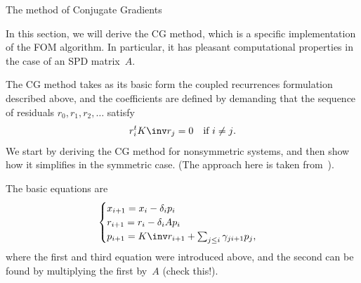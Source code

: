  {The method of Conjugate Gradients}
\label{sec:cg}

In this section, we will derive the \acf{CG} method, which is a
specific implementation of the \ac{FOM} algorithm. In particular, it
has pleasant computational properties in the case of an \ac{SPD}
matrix~$A$.

The \ac{CG} method takes as its basic form the coupled recurrences
formulation described above, and the
coefficients are defined by demanding that
the sequence of residuals $r_0,r_1,r_2,\ldots$ satisfy
\[ r_i^tK\inv r_j=0\quad\hbox{if $i\not=j$}. \]
We start by deriving the \ac{CG} method for nonsymmetric systems, and
then show how it simplifies in the symmetric case. (The approach here
is taken from~\cite{Eijkhout2010ICCS-krylov}).

The basic equations are
\begin{equation}
  \begin{cases}
    x_{i+1}=x_i-\delta_i p_i \\
    r_{i+1}=r_i-\delta_iA p_i \\
    p_{i+1} = K\inv r_{i+1}+\sum_{j\leq i}\gamma_{ji+1} p_j,
  \end{cases}
  \label{eq:xrp-update}
\end{equation}
where the first and third equation were introduced above, and the
second can be found by multiplying the first by~$A$ (check this!).

